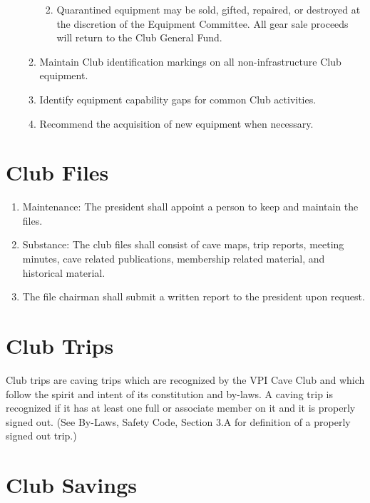 \documentclass[
]{article}
\providecommand{\tightlist}{%
  \setlength{\itemsep}{0pt}\setlength{\parskip}{0pt}}
\begin{document}
\begin{enumerate}
\begin{enumerate}
    \begin{enumerate}
    \def\labelenumiii{\roman{enumiii}.}
    \tightlist
    \item
      Quarantined equipment may be sold, gifted, repaired, or destroyed
      at the discretion of the Equipment Committee. All gear sale
      proceeds will return to the Club General Fund.
    \end{enumerate}
  \item
    Maintain Club identification markings on all non-infrastructure Club
    equipment.
  \item
    Identify equipment capability gaps for common Club activities.
  \item
    Recommend the acquisition of new equipment when necessary.
  \end{enumerate}
\end{enumerate}

\hypertarget{club-files}{%
\section{Club Files}\label{club-files}}

\begin{enumerate}
\def\labelenumi{\arabic{enumi}.}
\tightlist
\item
  Maintenance: The president shall appoint a person to keep and maintain
  the files.
\item
  Substance: The club files shall consist of cave maps, trip reports,
  meeting minutes, cave related publications, membership related
  material, and historical material.
\item
  The file chairman shall submit a written report to the president upon
  request.
\end{enumerate}

\hypertarget{club-trips}{%
\section{Club Trips}\label{club-trips}}

Club trips are caving trips which are recognized by the VPI Cave Club
and which follow the spirit and intent of its constitution and by-laws.
A caving trip is recognized if it has at least one full or associate
member on it and it is properly signed out. (See By-Laws, Safety Code,
Section 3.A for definition of a properly signed out trip.)

\hypertarget{club-savings}{%
\section{Club Savings}\label{club-savings}}
\end{document}
